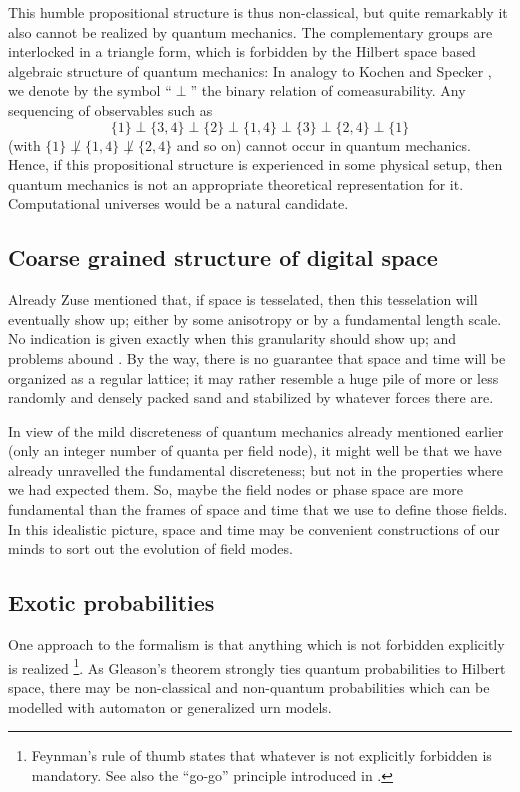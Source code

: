 \documentclass[pre,preprint,showpacs,showkeys,amsfonts]{revtex4}
\begin{document}
This humble propositional structure is thus non-classical, but
quite remarkably it also cannot
 be realized by quantum mechanics.
The complementary groups are interlocked in a triangle form, which is forbidden
by the Hilbert space based algebraic structure of quantum mechanics:
In analogy to Kochen and Specker \cite{kochen2},
we denote by the symbol ``$\perp$'' the binary relation of comeasurability.
Any sequencing of observables such as
$$\{1\}\perp \{3,4\}\perp \{2\}\perp \{1,4\}\perp \{3\}\perp \{2,4\}\perp \{1\}$$
(with
$\{1\}\not\perp  \{1,4\}\not\perp  \{2,4\}$ and so on)
cannot occur in quantum mechanics.
Hence, if this propositional structure is experienced in some physical setup,
then quantum mechanics is not an appropriate theoretical representation for it.
Computational universes would be a natural candidate.




\subsection{Coarse grained structure of digital space}


Already Zuse mentioned that, if space is tesselated, then this tesselation will
eventually show up; either by some anisotropy or by a fundamental length scale.
No indication is given exactly when this granularity should show up; and problems abound
\cite{thooft2}.
By the way, there is no guarantee that space and time will be organized
as a regular lattice;
it may rather resemble a huge pile of more or less
randomly and densely packed sand
and stabilized by whatever forces there are.

In view of the mild discreteness of quantum mechanics already mentioned
earlier (only an integer number of quanta per field node),
it might well be that we have already unravelled
the fundamental discreteness;
but not in the properties where we had expected them.
So, maybe the field nodes or phase space are more fundamental
than the frames of space and time that we use to define those fields.
In this idealistic picture,
space and time may be convenient constructions of our minds to sort
out the evolution of field modes.


\subsection{Exotic probabilities}

One approach to the formalism is that anything which is not
forbidden explicitly is realized
\footnote{
Feynman's rule of thumb states that whatever is not explicitly forbidden is mandatory.
See also the ``go-go'' principle  introduced in
\cite{svozil-set}.}.
As Gleason's theorem strongly ties quantum probabilities to
Hilbert space,
there may be non-classical and non-quantum
probabilities which can be modelled with automaton or generalized urn models.
\end{document}
